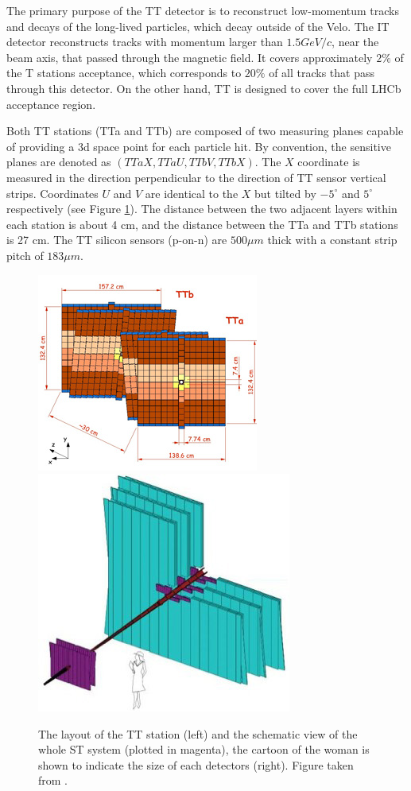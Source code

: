 The primary purpose of the TT detector is to reconstruct low-momentum tracks and decays of the long-lived particles, which decay outside of the Velo. The IT detector reconstructs tracks with momentum larger than $1.5 GeV/c$, near the beam axis, that passed through the magnetic field. It covers approximately $2\%$ of the T stations acceptance, which corresponds to $20\%$ of all tracks that pass through this detector. On the other hand, TT is designed to cover the full LHCb acceptance region.  

Both TT stations (TTa and TTb) are composed of two measuring planes capable of providing a 3d space point for each particle hit. By convention, the sensitive planes are denoted as $(TTaX, TTaU, TTbV, TTbX)$. The $X$ coordinate is measured in the direction perpendicular to the direction of TT sensor vertical strips. Coordinates $U$ and $V$ are identical to the $X$ but tilted  by $-5^{\circ}$ and $5^{\circ}$ respectively (see Figure \ref{fig:TT}). The distance between the two adjacent layers within each station is about 4 cm, and the distance between the TTa and TTb stations is 27 cm. The TT silicon sensors (p-on-n) are $500 \mu m$ thick with a constant strip pitch of $183 \mu m$.  

\begin{figure}[h]
 \begin{center}
  \includegraphics[width=0.49\linewidth]{figures/TT-layout.jpg}
   \includegraphics[width=0.49\linewidth]{figures/Tracking-system-diagram-2.jpg}
   \caption{The layout of the TT station (left) and the schematic view of the whole ST system (plotted in magenta), the cartoon of the woman is shown to indicate the size of each detectors (right). Figure taken from \cite{lhcb}.  
     \label{fig:TT}}
 \end{center}
\end{figure}

